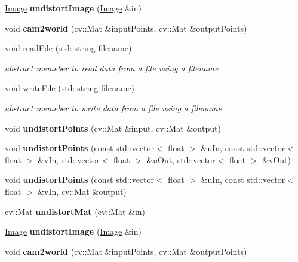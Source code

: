 \begin{DoxyCompactItemize}
\item 
\hyperlink{classImage}{Image} {\bfseries undistort\+Image} (\hyperlink{classImage}{Image} \&in)\hypertarget{classCameraCal_ad305161d3bb04ec8df1366d32dfd9c8d}{}\label{classCameraCal_ad305161d3bb04ec8df1366d32dfd9c8d}

\item 
void {\bfseries cam2world} (cv\+::\+Mat \&input\+Points, cv\+::\+Mat \&output\+Points)\hypertarget{classCameraCal_af768f460fecd28f833c6663c298719d4}{}\label{classCameraCal_af768f460fecd28f833c6663c298719d4}

\item 
void \hyperlink{classCameraCal_a2f47fc4ab16adcdd6269184340e087ed}{read\+File} (std\+::string filename)
\begin{DoxyCompactList}\small\item\em abstract memeber to read data from a file using a filename \end{DoxyCompactList}\item 
void \hyperlink{classCameraCal_aed026a2f07ceffeaf5591072cae13f99}{write\+File} (std\+::string filename)
\begin{DoxyCompactList}\small\item\em abstract memeber to write data from a file using a filename \end{DoxyCompactList}\item 
void {\bfseries undistort\+Points} (cv\+::\+Mat \&input, cv\+::\+Mat \&output)\hypertarget{classCameraCal_a9190758a8a5759f1d6b312ad3d97a093}{}\label{classCameraCal_a9190758a8a5759f1d6b312ad3d97a093}

\item 
void {\bfseries undistort\+Points} (const std\+::vector$<$ float $>$ \&u\+In, const std\+::vector$<$ float $>$ \&v\+In, std\+::vector$<$ float $>$ \&u\+Out, std\+::vector$<$ float $>$ \&v\+Out)\hypertarget{classCameraCal_abdfe8dff383368dc307cac7428bc9ec3}{}\label{classCameraCal_abdfe8dff383368dc307cac7428bc9ec3}

\item 
void {\bfseries undistort\+Points} (const std\+::vector$<$ float $>$ \&u\+In, const std\+::vector$<$ float $>$ \&v\+In, cv\+::\+Mat \&output)\hypertarget{classCameraCal_afa30ca95ccf257c211274dc0ebc8d707}{}\label{classCameraCal_afa30ca95ccf257c211274dc0ebc8d707}

\item 
cv\+::\+Mat {\bfseries undistort\+Mat} (cv\+::\+Mat \&in)\hypertarget{classCameraCal_a61ac0d332a40375867c9f445e2bf62ce}{}\label{classCameraCal_a61ac0d332a40375867c9f445e2bf62ce}

\item 
\hyperlink{classImage}{Image} {\bfseries undistort\+Image} (\hyperlink{classImage}{Image} \&in)\hypertarget{classCameraCal_ad305161d3bb04ec8df1366d32dfd9c8d}{}\label{classCameraCal_ad305161d3bb04ec8df1366d32dfd9c8d}

\item 
void {\bfseries cam2world} (cv\+::\+Mat \&input\+Points, cv\+::\+Mat \&output\+Points)\hypertarget{classCameraCal_af768f460fecd28f833c6663c298719d4}{}\label{classCameraCal_af768f460fecd28f833c6663c298719d4}

\end{DoxyCompactItemize}
